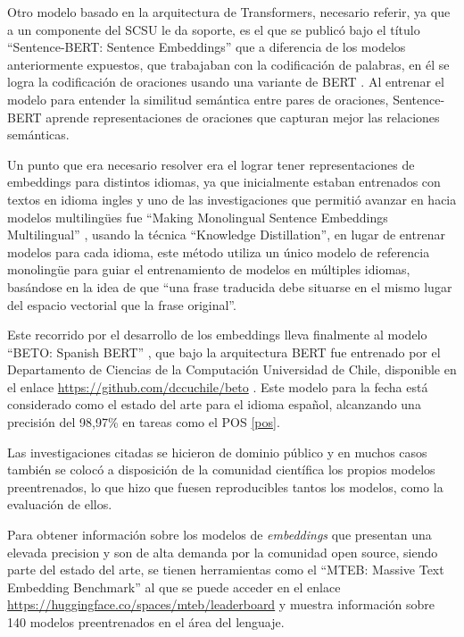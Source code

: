 \documentclass[
  10,
  openany]{book}
\begin{document}
Otro modelo basado en la arquitectura de Transformers, necesario referir, ya que a un componente del SCSU le da soporte, es el que se publicó bajo el título ``Sentence-BERT: Sentence Embeddings'' \citep{reimers2019a} que a diferencia de los modelos anteriormente expuestos, que trabajaban con la codificación de palabras, en él se logra la codificación de oraciones usando una variante de BERT \citep{devlin2018}. Al entrenar el modelo para entender la similitud semántica entre pares de oraciones, Sentence-BERT aprende representaciones de oraciones que capturan mejor las relaciones semánticas.

Un punto que era necesario resolver era el lograr tener representaciones de embeddings para distintos idiomas, ya que inicialmente estaban entrenados con textos en idioma ingles y uno de las investigaciones que permitió avanzar en hacia modelos multilingües fue ``Making Monolingual Sentence Embeddings Multilingual'' \citep{reimers2020}, usando la técnica ``Knowledge Distillation'', en lugar de entrenar modelos para cada idioma, este método utiliza un único modelo de referencia monolingüe para guiar el entrenamiento de modelos en múltiples idiomas, basándose en la idea de que ``una frase traducida debe situarse en el mismo lugar del espacio vectorial que la frase original''.

Este recorrido por el desarrollo de los embeddings lleva finalmente al modelo ``BETO: Spanish BERT'' \citep{CaneteCFP2020}, que bajo la arquitectura BERT fue entrenado por el Departamento de Ciencias de la Computación Universidad de Chile, disponible en el enlace \url{https://github.com/dccuchile/beto} . Este modelo para la fecha está considerado como el estado del arte para el idioma español, alcanzando una precisión del 98,97\% en tareas como el POS \ref{pos}.

Las investigaciones citadas se hicieron de dominio público y en muchos casos también se colocó a disposición de la comunidad científica los propios modelos preentrenados, lo que hizo que fuesen reproducibles tantos los modelos, como la evaluación de ellos.

Para obtener información sobre los modelos de \emph{embeddings} que presentan una elevada precision y son de alta demanda por la comunidad open source, siendo parte del estado del arte, se tienen herramientas como el ``MTEB: Massive Text Embedding Benchmark'' \citep{muennighoff2022} al que se puede acceder en el enlace \url{https://huggingface.co/spaces/mteb/leaderboard} y muestra información sobre 140 modelos preentrenados en el área del lenguaje.
\end{document}
